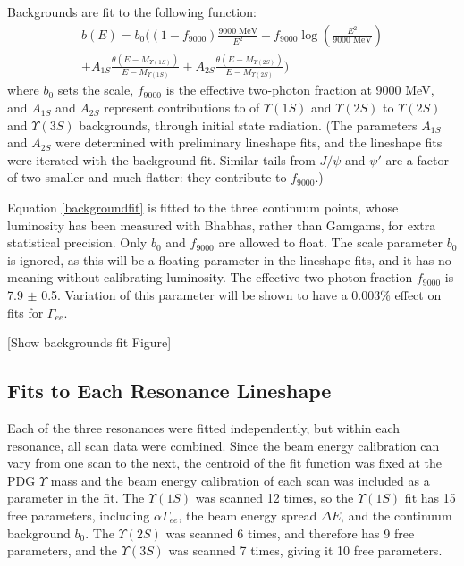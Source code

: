 \documentclass[aps,prd,preprint,superscriptaddress,tightenlines,nofootinbib,floatfix]{revtex4}
\begin{document}
Backgrounds are fit to the following function:
\begin{multline}
  \label{backgroundfit}
  b(E) = b_0 \bigg( (1 - f_{9000}) \frac{\mbox{9000 MeV}}{E^2} +
  f_{9000} \log\left(\frac{E^2}{\mbox{9000 MeV}}\right) \\
  + A_{1S} \frac{\theta(E - M_{\Upsilon(1S)})}{E - M_{\Upsilon(1S)}} +
  A_{2S} \frac{\theta(E - M_{\Upsilon(2S)})}{E - M_{\Upsilon(2S)}} \bigg)
\end{multline}
where $b_0$ sets the scale, $f_{9000}$ is the effective two-photon
fraction at 9000 MeV, and $A_{1S}$ and $A_{2S}$ represent
contributions to of $\Upsilon(1S)$ and $\Upsilon(2S)$ to
$\Upsilon(2S)$ and $\Upsilon(3S)$ backgrounds, through initial state
radiation.  (The parameters $A_{1S}$ and $A_{2S}$ were determined with
preliminary lineshape fits, and the lineshape fits were iterated with
the background fit.  Similar tails from $J/\psi$ and $\psi'$ are a
factor of two smaller and much flatter: they contribute to
$f_{9000}$.)

Equation \ref{backgroundfit} is fitted to the three continuum points,
whose luminosity has been measured with Bhabhas, rather than Gamgams,
for extra statistical precision.  Only $b_0$ and $f_{9000}$ are
allowed to float.  The scale parameter $b_0$ is ignored, as this will
be a floating parameter in the lineshape fits, and it has no meaning
without calibrating luminosity.  The effective two-photon fraction
$f_{9000}$ is 7.9 $\pm$ 0.5.  Variation of this parameter will be
shown to have a 0.003\% effect on fits for $\Gamma_{ee}$.

[Show backgrounds fit Figure]

%
\subsection{Fits to Each Resonance Lineshape}
%

Each of the three resonances were fitted independently, but within
each resonance, all scan data were combined.  Since the beam energy
calibration can vary from one scan to the next, the centroid of the
fit function was fixed at the PDG $\Upsilon$ mass and the beam energy
calibration of each scan was included as a parameter in the fit.  The
$\Upsilon(1S)$ was scanned 12 times, so the $\Upsilon(1S)$ fit has 15
free parameters, including $\alpha\Gamma_{ee}$, the beam energy spread
$\Delta E$, and the continuum background $b_0$.  The $\Upsilon(2S)$
was scanned 6 times, and therefore has 9 free parameters, and the
$\Upsilon(3S)$ was scanned 7 times, giving it 10 free parameters.
\end{document}
